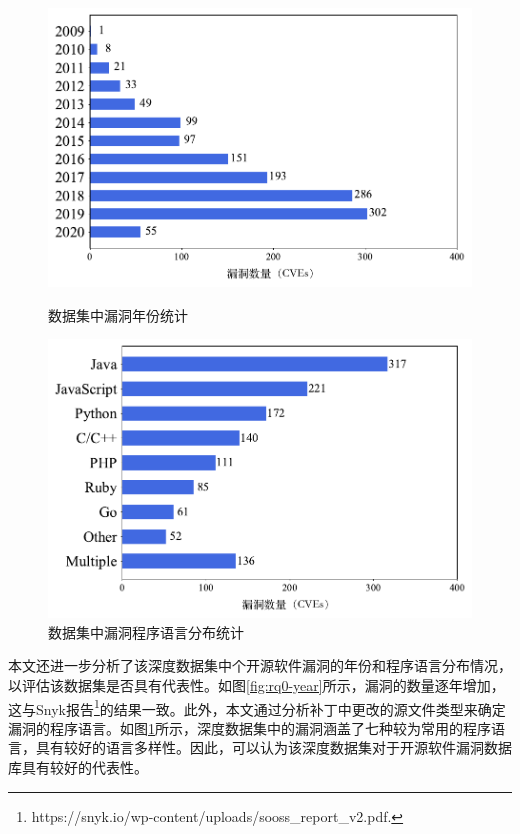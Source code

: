 \begin{figure}[!t]
    \centering
    \includegraphics[scale=0.80]{fig/rq0-year.pdf}
    \caption{数据集中漏洞年份统计}\label{fig:rq0-year}
    \centering
    \includegraphics[scale=0.80]{fig/rq0-language.pdf}
    \caption{数据集中漏洞程序语言分布统计}\label{fig:rq0-language}
\end{figure}

    

本文还进一步分析了该深度数据集中个开源软件漏洞的年份和程序语言分布情况，以评估该数据集是否具有代表性。如图\ref{fig:rq0-year}所示，漏洞的数量逐年增加，这与Snyk报告\footnote{https://snyk.io/wp-content/uploads/sooss\_report\_v2.pdf.}的结果一致。此外，本文通过分析补丁中更改的源文件类型来确定漏洞的程序语言。如图\ref{fig:rq0-language}所示，深度数据集中的漏洞涵盖了七种较为常用的程序语言，具有较好的语言多样性。因此，可以认为该深度数据集对于开源软件漏洞数据库具有较好的代表性。



